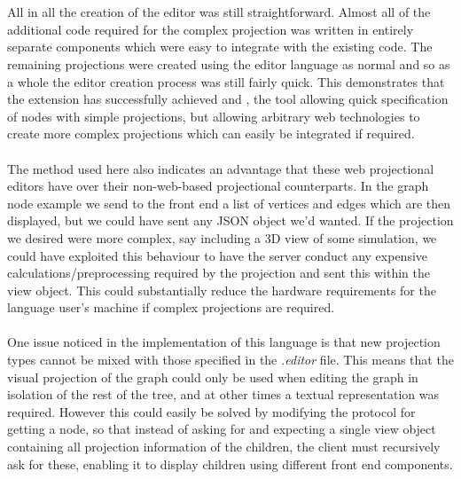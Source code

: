 \documentclass{article}
\begin{document}
{\\
\\
All in all the creation of the editor was still straightforward. Almost all of the additional code required for the complex projection was written in entirely separate components which were easy to integrate with the existing code. The remaining projections were created using the editor language as normal and so as a whole the editor creation process was still fairly quick. This demonstrates that the extension has successfully achieved \RSetup and \RCustom, the tool allowing quick specification of nodes with simple projections, but allowing arbitrary web technologies to create more complex projections which can easily be integrated if required. 
\\
\\
The method used here also indicates an advantage that these web projectional editors have over their non-web-based projectional counterparts. In the graph node example we send to the front end a list of vertices and edges which are then displayed, but we could have sent any JSON object we'd wanted. If the projection we desired were more complex, say including a 3D view of some simulation, we could have exploited this behaviour to have the server conduct any expensive calculations/preprocessing required by the projection and sent this within the view object. This could substantially reduce the hardware requirements for the language user's machine if complex projections are required.
\\
\\
One issue noticed in the implementation of this language is that new projection types cannot be mixed with those specified in the \emph{.editor} file. This means that the visual projection of the graph could only be used when editing the graph in isolation of the rest of the tree, and at other times a textual representation was required. However this could easily be solved by modifying the protocol for getting a node, so that instead of asking for and expecting a single view object containing all projection information of the children, the client must recursively ask for these, enabling it to display children using different front end components.
%
%

}
\end{document}

